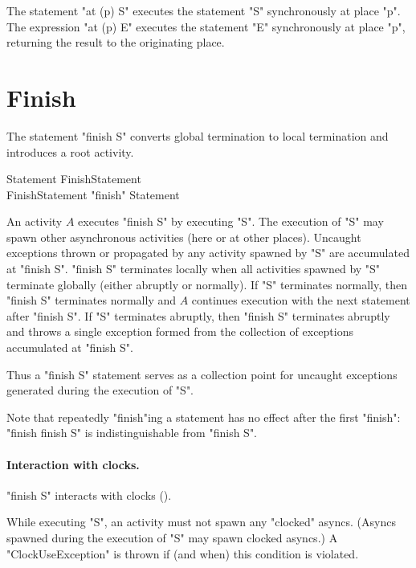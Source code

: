 The statement \xcd"at (p) S" executes the statement \xcd"S"
synchronously at place \xcd"p".
The expression \xcd"at (p) E" executes the statement \xcd"E"
synchronously at place \xcd"p", returning the result to the
originating place.

\section{Finish}\label{finish}
The statement \xcd"finish S" converts global termination to local
termination and introduces a root activity. 

\begin{grammar}
Statement \: FinishStatement \\
FinishStatement \: \xcd"finish" Statement \\
\end{grammar}

An activity $A$ executes \xcd"finish S" by executing \xcd"S".  The
execution of \xcd"S" may spawn other asynchronous activities (here or
at other places).  Uncaught exceptions thrown or propagated by any
activity spawned by \xcd"S" are accumulated at \xcd"finish S".
\xcd"finish S" terminates locally when all activities spawned by \xcd"S"
terminate globally (either abruptly or normally). If
\xcd"S" terminates normally, then \xcd"finish S" terminates normally
and $A$ continues execution with the next statement after \xcd"finish S".
If \xcd"S" terminates abruptly, then \xcd"finish S"
terminates abruptly and throws a single exception formed 
from the collection of exceptions accumulated at \xcd"finish S".

Thus a \xcd"finish S" statement serves as a collection point for
uncaught exceptions generated during the execution of \xcd"S".

Note that repeatedly \xcd"finish"ing a statement has no effect after
the first \xcd"finish": \xcd"finish finish S" is indistinguishable
from \xcd"finish S".

\paragraph{Interaction with clocks.}\label{sec:finish:clock-rule}
\xcd"finish S" interacts with clocks (). 

While executing \xcd"S", an activity must not spawn any \xcd"clocked"
asyncs. (Asyncs spawned during the execution of \xcd"S" may spawn
clocked asyncs.) A
\xcd"ClockUseException" is thrown
if (and when) this condition is violated.

